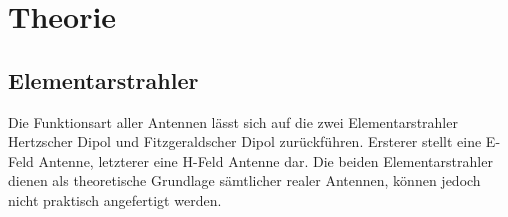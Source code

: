 \newpage
\chapter{Theorie}
\label{sec:Theorie}
\section{Elementarstrahler}\label{sec:ElementareStrahler}
Die Funktionsart aller Antennen lässt sich auf die zwei Elementarstrahler Hertzscher Dipol und Fitzgeraldscher Dipol zurückführen. Ersterer stellt eine E-Feld Antenne, letzterer eine H-Feld Antenne dar. Die beiden Elementarstrahler dienen als theoretische Grundlage sämtlicher realer Antennen, können jedoch nicht praktisch angefertigt werden.

